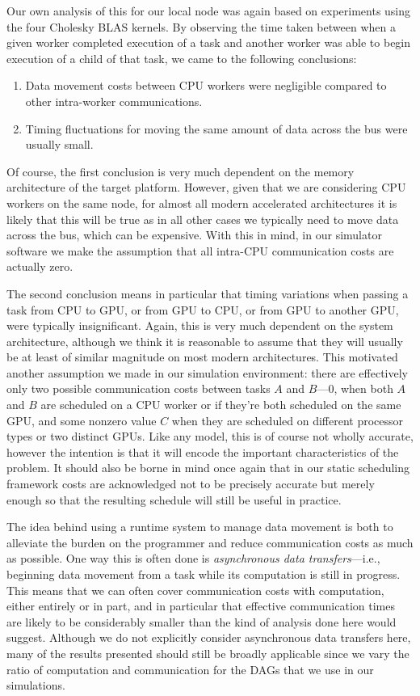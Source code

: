 \documentclass[runningheads]{llncs}
\begin{document}
Our own analysis of this for our local node was again based on experiments using the four Cholesky BLAS kernels. By observing the time taken between when a given worker completed execution of a task and another worker was able to begin execution of a child of that task, we came to the following conclusions:
\begin{enumerate}
	\item Data movement costs between CPU workers were negligible compared to other intra-worker communications.
	\item Timing fluctuations for moving the same amount of data across the bus were usually small. 
\end{enumerate}

Of course, the first conclusion is very much dependent on the memory architecture of the target platform. However, given that we are considering CPU workers on the same node, for almost all modern accelerated architectures it is likely that this will be true as in all other cases we typically need to move data across the bus, which can be expensive. With this in mind, in our simulator software we make the assumption that all intra-CPU communication costs are actually zero. 

The second conclusion means in particular that timing variations when passing a task from CPU to GPU, or from GPU to CPU, or from GPU to another GPU, were typically insignificant. Again, this is very much dependent on the system architecture, although we think it is reasonable to assume that they will usually be at least of similar magnitude on most modern architectures. This motivated another assumption we made in our simulation environment: there are effectively only two possible communication costs between tasks $A$ and $B$---0, when both $A$ and $B$ are scheduled on a CPU worker or if they're both scheduled on the same GPU, and some nonzero value $C$ when they are scheduled on different processor types or two distinct GPUs. Like any model, this is of course not wholly accurate, however the intention is that it will encode the important characteristics of the problem. It should also be borne in mind once again that in our static scheduling framework costs are acknowledged not to be precisely accurate but merely enough so that the resulting schedule will still be useful in practice. 

The idea behind using a runtime system to manage data movement is both to alleviate the burden on the programmer and reduce communication costs as much as possible. One way this is often done is {\em asynchronous data transfers}---i.e., beginning data movement from a task while its computation is still in progress. This means that we can often cover communication costs with computation, either entirely or in part, and in particular that effective communication times are likely to be considerably smaller than the kind of analysis done here would suggest. Although we do not explicitly consider asynchronous data transfers here, many of the results presented should still be broadly applicable since we vary the ratio of computation and communication for the DAGs that we use in our simulations. 
\end{document}

